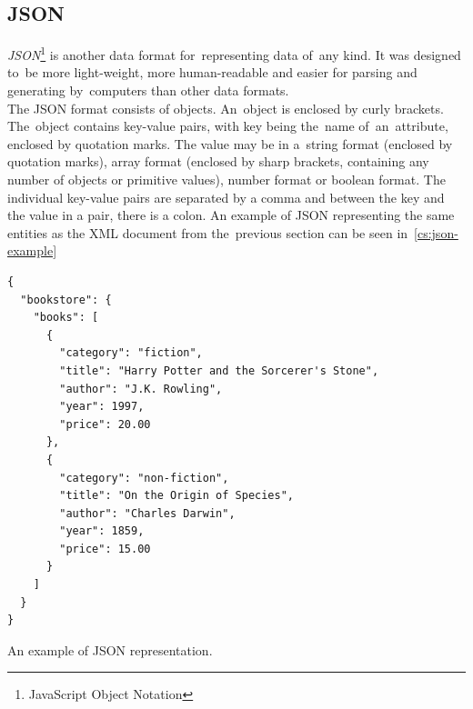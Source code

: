 \subsection{JSON}
\textit{JSON}\footnote{JavaScript Object Notation} is another data format for~representing data of~any kind. It was designed to~be more light-weight, more human-readable and easier for parsing and generating by~computers than other data formats. \\
The JSON format consists of objects. An~object is enclosed by curly brackets. The~object contains key-value pairs, with key being the~name of~an~attribute, enclosed by quotation marks. The value may be in a~string format (enclosed by quotation marks), array format (enclosed by sharp brackets, containing any number of objects or primitive values), number format or boolean format. The individual key-value pairs are separated by a comma and between the key and the value in a pair, there is a colon.
An example of JSON representing the same entities as the XML document from the~previous section can be seen in~\autoref{cs:json-example}~\cite{json}
\begin{listing}[ht!]
    \begin{verbatim}
{
  "bookstore": {
    "books": [
      {
        "category": "fiction",
        "title": "Harry Potter and the Sorcerer's Stone",
        "author": "J.K. Rowling",
        "year": 1997,
        "price": 20.00
      },
      {
        "category": "non-fiction",
        "title": "On the Origin of Species",
        "author": "Charles Darwin",
        "year": 1859,
        "price": 15.00
      }
    ]
  }
}
\end{verbatim}
\caption{An example of JSON representation.}
\label{cs:json-example}
\end{listing}

